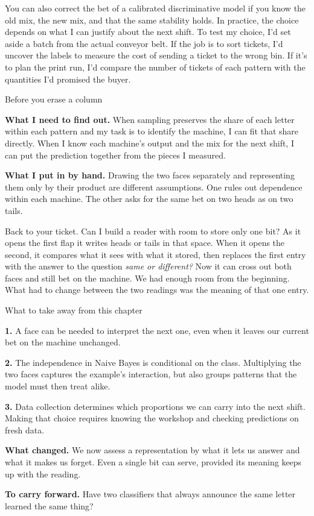 \documentclass[12pt,oneside]{article}
\newcommand{\itemq}[1]{\par\textbf{#1.}\enspace}
\begin{document}
You can also correct the bet of a calibrated discriminative model if you know the old mix, the new mix, and that the same stability holds. In practice, the choice depends on what I can justify about the next shift. To test my choice, I'd set aside a batch from the actual conveyor belt. If the job is to sort tickets, I'd uncover the labels to measure the cost of sending a ticket to the wrong bin. If it's to plan the print run, I'd compare the number of tickets of each pattern with the quantities I'd promised the buyer.

\begin{quadro}{Before you erase a column}
\itemq{What I need to find out} When sampling preserves the share of each letter within each pattern and my task is to identify the machine, I can fit that share directly. When I know each machine's output and the mix for the next shift, I can put the prediction together from the pieces I measured.
\itemq{What I put in by hand} Drawing the two faces separately and representing them only by their product are different assumptions. One rules out dependence within each machine. The other asks for the same bet on two heads as on two tails.
\end{quadro}

Back to your ticket. Can I build a reader with room to store only one bit? As it opens the first flap it writes heads or tails in that space. When it opens the second, it compares what it sees with what it stored, then replaces the first entry with the answer to the question \emph{same or different?} Now it can cross out both faces and still bet on the machine. We had enough room from the beginning. What had to change between the two readings was the meaning of that one entry.

\begin{quadro}{What to take away from this chapter}
\itemq{1} A face can be needed to interpret the next one, even when it leaves our current bet on the machine unchanged.
\itemq{2} The independence in Naive Bayes is conditional on the class. Multiplying the two faces captures the example's interaction, but also groups patterns that the model must then treat alike.
\itemq{3} Data collection determines which proportions we can carry into the next shift. Making that choice requires knowing the workshop and checking predictions on fresh data.
\itemq{What changed} We now assess a representation by what it lets us answer and what it makes us forget. Even a single bit can serve, provided its meaning keeps up with the reading.
\itemq{To carry forward} Have two classifiers that always announce the same letter learned the same thing?
\end{quadro}
\end{document}
